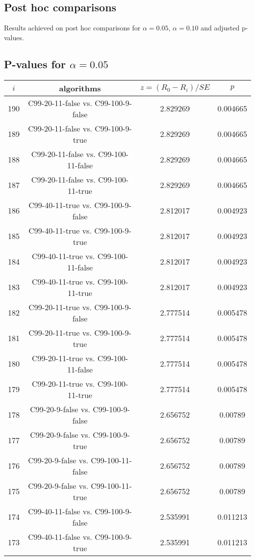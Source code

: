 \documentclass[a4paper,10pt]{article}
\begin{document}
\begin{landscape}
\pagebreak

\section{Post hoc comparisons}

Results achieved on post hoc comparisons for $\alpha = 0.05$, $\alpha = 0.10$ and adjusted p-values.

\subsection{P-values for $\alpha=0.05$}

\begin{table}[!htp]
\centering\scriptsize
\begin{tabular}{cccc}
$i$&algorithms&$z=(R_0 - R_i)/SE$&$p$\\
\hline190&C99-20-11-false vs. C99-100-9-false&2.829269&0.004665\\
189&C99-20-11-false vs. C99-100-9-true&2.829269&0.004665\\
188&C99-20-11-false vs. C99-100-11-false&2.829269&0.004665\\
187&C99-20-11-false vs. C99-100-11-true&2.829269&0.004665\\
186&C99-40-11-true vs. C99-100-9-false&2.812017&0.004923\\
185&C99-40-11-true vs. C99-100-9-true&2.812017&0.004923\\
184&C99-40-11-true vs. C99-100-11-false&2.812017&0.004923\\
183&C99-40-11-true vs. C99-100-11-true&2.812017&0.004923\\
182&C99-20-11-true vs. C99-100-9-false&2.777514&0.005478\\
181&C99-20-11-true vs. C99-100-9-true&2.777514&0.005478\\
180&C99-20-11-true vs. C99-100-11-false&2.777514&0.005478\\
179&C99-20-11-true vs. C99-100-11-true&2.777514&0.005478\\
178&C99-20-9-false vs. C99-100-9-false&2.656752&0.00789\\
177&C99-20-9-false vs. C99-100-9-true&2.656752&0.00789\\
176&C99-20-9-false vs. C99-100-11-false&2.656752&0.00789\\
175&C99-20-9-false vs. C99-100-11-true&2.656752&0.00789\\
174&C99-40-11-false vs. C99-100-9-false&2.535991&0.011213\\
173&C99-40-11-false vs. C99-100-9-true&2.535991&0.011213\\

\end{tabular}
\end{table}
\end{landscape}
\end{document}
